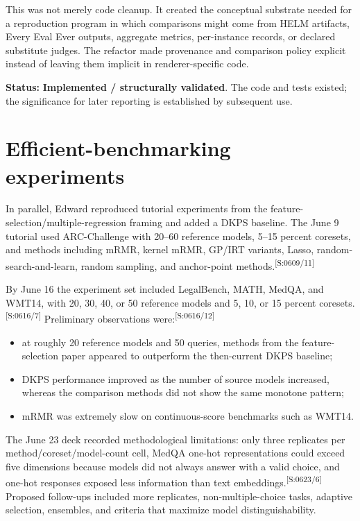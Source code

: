 \documentclass[11pt,oneside]{report}
\newcommand{\statusImplemented}{\textcolor{implemented}{\textbf{Implemented / structurally validated}}\xspace}
\newcommand{\evmark}[1]{\allowbreak\textsuperscript{\scriptsize\textnormal{[#1]}}}
\newcommand{\slideref}[2]{\evmark{S:#1/#2}}
\begin{document}
This was not merely code cleanup. It created the conceptual substrate needed for a reproduction program in which comparisons might come from HELM artifacts, Every Eval Ever outputs, aggregate metrics, per-instance records, or declared substitute judges. The refactor made provenance and comparison policy explicit instead of leaving them implicit in renderer-specific code.

\textbf{Status:} \statusImplemented. The code and tests existed; the significance for later reporting is established by subsequent use.

\section{Efficient-benchmarking experiments}

In parallel, Edward reproduced tutorial experiments from the feature-selection/multiple-regression framing and added a DKPS baseline. The June 9 tutorial used ARC-Challenge with 20--60 reference models, 5--15 percent coresets, and methods including mRMR, kernel mRMR, GP/IRT variants, Lasso, random-search-and-learn, random sampling, and anchor-point methods.\slideref{0609}{11}

By June 16 the experiment set included LegalBench, MATH, MedQA, and WMT14, with 20, 30, 40, or 50 reference models and 5, 10, or 15 percent coresets.\slideref{0616}{7} Preliminary observations were:\slideref{0616}{12}

\begin{itemize}
  \item at roughly 20 reference models and 50 queries, methods from the feature-selection paper appeared to outperform the then-current DKPS baseline;
  \item DKPS performance improved as the number of source models increased, whereas the comparison methods did not show the same monotone pattern;
  \item mRMR was extremely slow on continuous-score benchmarks such as WMT14.
\end{itemize}

The June 23 deck recorded methodological limitations: only three replicates per method/coreset/model-count cell, MedQA one-hot representations could exceed five dimensions because models did not always answer with a valid choice, and one-hot responses exposed less information than text embeddings.\slideref{0623}{6} Proposed follow-ups included more replicates, non-multiple-choice tasks, adaptive selection, ensembles, and criteria that maximize model distinguishability.
\end{document}
